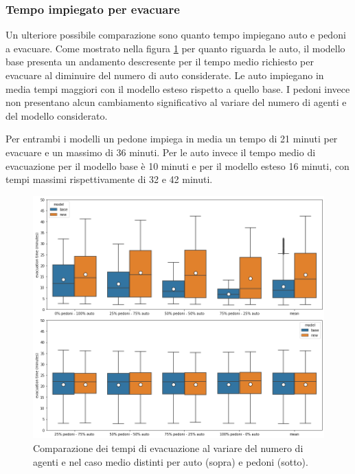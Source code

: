 \pagebreak

\subsubsection*{Tempo impiegato per evacuare}

Un ulteriore possibile comparazione sono quanto tempo impiegano auto e pedoni a evacuare.
Come mostrato nella figura \ref{fig:analisi-comparison-evtimes2} per quanto riguarda le auto, il modello base presenta un andamento descresente per il tempo medio richiesto per evacuare al diminuire del numero di auto considerate.
Le auto impiegano in media tempi maggiori con il modello esteso rispetto a quello base.
%
I pedoni invece non presentano alcun cambiamento significativo al variare del numero di agenti e del modello considerato. 

Per entrambi i modelli un pedone impiega in media un tempo di 21 minuti per evacuare e un massimo di 36 minuti.
Per le auto invece il tempo medio di evacuazione per il modello base è 10 minuti e per il modello esteso 16 minuti, 
con tempi massimi rispettivamente di 32 e 42 minuti.

\begin{figure}[ht]
    \centering
    \includegraphics[width=\textwidth]{images/analisi/comparison-evtimes2.png}
    \caption{
        Comparazione dei tempi di evacuazione al variare del numero di agenti e nel caso medio distinti per auto (sopra) e pedoni (sotto).
    }
    \label{fig:analisi-comparison-evtimes2}
\end{figure}

